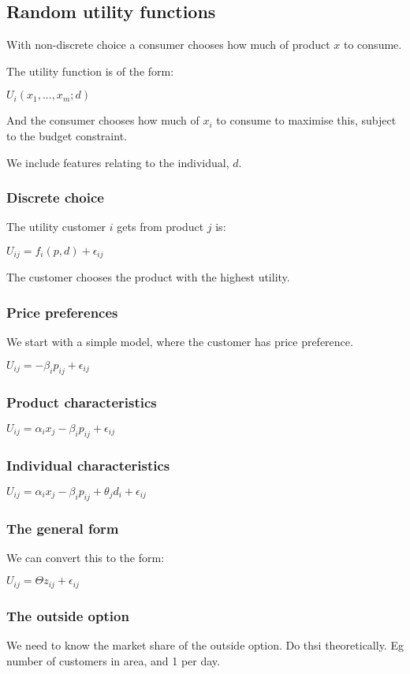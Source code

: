
\subsection{Random utility functions}

With non-discrete choice a consumer chooses how much of product \(x\) to consume.

The utility function is of the form:

\(U_i(x_1,...,x_m;d)\)

And the consumer chooses how much of \(x_i\) to consume to maximise this, subject to the budget constraint.

We include features relating to the individual, \(d\).

\subsubsection{Discrete choice}

The utility customer \(i\) gets from product \(j\) is:

\(U_{ij}=f_i(p,d)+\epsilon_{ij}\)

The customer chooses the product with the highest utility.

\subsubsection{Price preferences}

We start with a simple model, where the customer has price preference.

\(U_{ij}=-\beta_i p_{ij} +\epsilon_{ij}\)

\subsubsection{Product characteristics}

\(U_{ij}=\alpha_i x_j -\beta_i p_{ij} +\epsilon_{ij}\)

\subsubsection{Individual characteristics}

\(U_{ij}=\alpha_i x_j -\beta_i p_{ij} + \theta_j d_i +\epsilon_{ij}\)

\subsubsection{The general form}

We can convert this to the form:

\(U_{ij}=\Theta z_{ij} + \epsilon_{ij}\)

\subsubsection{The outside option}

We need to know the market share of the outside option. Do thsi theoretically. Eg number of customers in area, and 1 per day.

